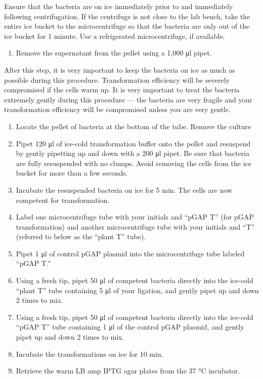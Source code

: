 \documentclass[]{book}
\providecommand{\tightlist}{%
  \setlength{\itemsep}{0pt}\setlength{\parskip}{0pt}}
\let\BeginKnitrBlock\begin \let\EndKnitrBlock\end
\begin{document}
\BeginKnitrBlock{rmdimportant}
Ensure that the bacteria are on ice immediately prior to and immediately following centrifugation. If the centrifuge is not close to the lab bench, take the entire ice bucket to the microcentrifuge so that the bacteria are only out of the ice bucket for 1 minute. Use a refrigerated microcentrifuge, if available.
\EndKnitrBlock{rmdimportant}

\begin{enumerate}
\def\labelenumi{\arabic{enumi}.}
\setcounter{enumi}{11}
\tightlist
\item
  Remove the supernatant from the pellet using a 1,000 μl pipet.
\end{enumerate}

\BeginKnitrBlock{rmdimportant}
After this step, it is very important to keep the bacteria on ice as much as possible during this procedure. Transformation efficiency will be severely compromised if the cells warm up. It is very important to treat the bacteria extremely gently during this procedure --- the bacteria are very fragile and your transformation efficiency will be compromised unless you are very gentle.
\EndKnitrBlock{rmdimportant}

\begin{enumerate}
\def\labelenumi{\arabic{enumi}.}
\setcounter{enumi}{12}
\tightlist
\item
  Locate the pellet of bacteria at the bottom of the tube. Remove the culture
\item
  Pipet 120 μl of ice-cold transformation buffer onto the pellet and resuspend by gently pipetting up and down with a 200 μl pipet. Be sure that bacteria are fully resuspended with no clumps. Avoid removing the cells from the ice bucket for more than a few seconds.
\item
  Incubate the resuspended bacteria on ice for 5 min.
  The cells are now competent for transformation.
\item
  Label one microcentrifuge tube with your initials and ``pGAP T'' (for pGAP transformation) and another microcentrifuge tube with your initials and ``T'' (referred to below as the ``plant T'' tube).
\item
  Pipet 1 μl of control pGAP plasmid into the microcentrifuge tube labeled ``pGAP T.''
\item
  Using a fresh tip, pipet 50 μl of competent bacteria directly into the ice-cold ``plant T'' tube containing 5 μl of your ligation, and gently pipet up and down 2 times to mix.
\item
  Using a fresh tip, pipet 50 μl of competent bacteria directly into the ice-cold ``pGAP T'' tube containing 1 μl of the control pGAP plasmid, and gently pipet up and down 2 times to mix.
\item
  Incubate the transformations on ice for 10 min.
\item
  Retrieve the warm LB amp IPTG agar plates from the 37 °C incubator.
\end{enumerate}
\end{document}
